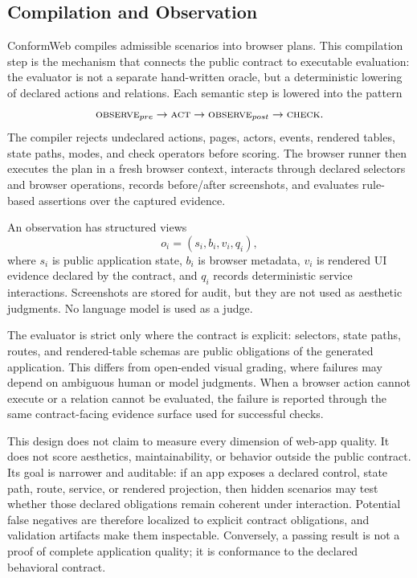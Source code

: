 \subsection{Compilation and Observation}
\label{sec:compilation}

ConformWeb compiles admissible scenarios into browser plans. This compilation
step is the mechanism that connects the public contract to executable
evaluation: the evaluator is not a separate hand-written oracle, but a
deterministic lowering of declared actions and relations. Each semantic step is
lowered into the pattern
\begin{equation}
\textsc{observe}_{pre}
\rightarrow
\textsc{act}
\rightarrow
\textsc{observe}_{post}
\rightarrow
\textsc{check}.
\end{equation}
The compiler rejects undeclared actions, pages, actors, events, rendered
tables, state paths, modes, and check operators before scoring. The browser
runner then executes the plan in a fresh browser context, interacts through
declared selectors and browser operations, records before/after screenshots,
and evaluates rule-based assertions over the captured evidence.

An observation has structured views
\begin{equation}
o_i=(s_i,b_i,v_i,q_i),
\end{equation}
where \(s_i\) is public application state, \(b_i\) is browser metadata,
\(v_i\) is rendered UI evidence declared by the contract, and \(q_i\) records
deterministic service interactions. Screenshots are stored for audit, but they
are not used as aesthetic judgments. No language model is used as a judge.

The evaluator is strict only where the contract is explicit: selectors, state
paths, routes, and rendered-table schemas are public obligations of the
generated application. This differs from open-ended visual grading, where
failures may depend on ambiguous human or model judgments. When a browser
action cannot execute or a relation cannot be evaluated, the failure is
reported through the same contract-facing evidence surface used for successful
checks.

This design does not claim to measure every dimension of web-app quality. It
does not score aesthetics, maintainability, or behavior outside the public
contract. Its goal is narrower and auditable: if an app exposes a declared
control, state path, route, service, or rendered projection, then hidden
scenarios may test whether those declared obligations remain coherent under
interaction. Potential false negatives are therefore localized to explicit
contract obligations, and validation artifacts make them inspectable.
Conversely, a passing result is not a proof of complete application quality; it
is conformance to the declared behavioral contract.

